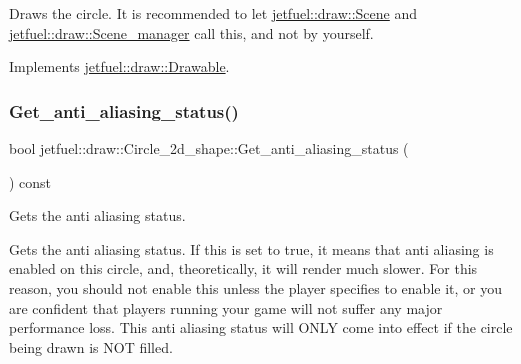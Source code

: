 Draws the circle. It is recommended to let \hyperlink{classjetfuel_1_1draw_1_1Scene}{jetfuel\+::draw\+::\+Scene} and \hyperlink{classjetfuel_1_1draw_1_1Scene__manager}{jetfuel\+::draw\+::\+Scene\+\_\+manager} call this, and not by yourself. 

Implements \hyperlink{classjetfuel_1_1draw_1_1Drawable_a1a072070322965ce9411ee6e7c311c56}{jetfuel\+::draw\+::\+Drawable}.

\mbox{\label{classjetfuel_1_1draw_1_1Circle__2d__shape_af5e8ebfd4c5102e25263500c0a2075b9}} 
\subsubsection{\texorpdfstring{Get\+\_\+anti\+\_\+aliasing\+\_\+status()}{Get\_anti\_aliasing\_status()}}
{\footnotesize\ttfamily bool jetfuel\+::draw\+::\+Circle\+\_\+2d\+\_\+shape\+::\+Get\+\_\+anti\+\_\+aliasing\+\_\+status (\begin{DoxyParamCaption}{ }\end{DoxyParamCaption}) const\hspace{0.3cm}{\ttfamily [inline]}}



Gets the anti aliasing status. 

Gets the anti aliasing status. If this is set to true, it means that anti aliasing is enabled on this circle, and, theoretically, it will render much slower. For this reason, you should not enable this unless the player specifies to enable it, or you are confident that players running your game will not suffer any major performance loss. This anti aliasing status will O\+N\+LY come into effect if the circle being drawn is N\+OT filled. \mbox{\label{classjetfuel_1_1draw_1_1Circle__2d__shape_ab188ed6716dff22d0498a01ac1e93d90}} 
